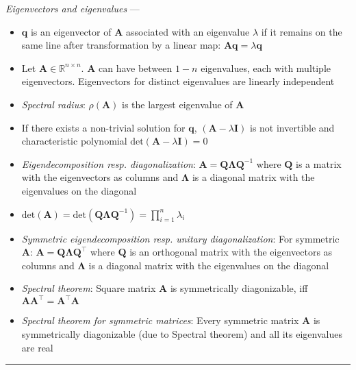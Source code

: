 \emph{Eigenvectors and eigenvalues} --- 
\begin{itemize}
    \item $\boldsymbol{q}$ is an eigenvector of $\boldsymbol{A}$ associated with an eigenvalue $\lambda$ if it remains on the same line after transformation by a linear map: $\boldsymbol{A}\boldsymbol{q} = \lambda\boldsymbol{q}$
    \item Let $\boldsymbol{A} \in \mathbb{R}^{n \times n}$. $\boldsymbol{A}$ can have between $1-n$ eigenvalues, each with multiple eigenvectors. Eigenvectors for distinct eigenvalues are linearly independent
    \item \emph{Spectral radius}: $\rho(\boldsymbol{A})$ is the largest eigenvalue of $\boldsymbol{A}$
    \item If there exists a non-trivial solution for $\boldsymbol{q}$, $(\boldsymbol{A}-\lambda\boldsymbol{I})$ is not invertible and characteristic polynomial $\textrm{det}(\boldsymbol{A}-\lambda\boldsymbol{I}) = 0$
    \item \emph{Eigendecomposition resp. diagonalization}: $\boldsymbol{A} = \boldsymbol{Q}\boldsymbol{\Lambda}\boldsymbol{Q}^{-1}$ where $\boldsymbol{Q}$ is a matrix with the eigenvectors as columns and $\boldsymbol{\Lambda}$ is a diagonal matrix with the eigenvalues on the diagonal
    \item $\textrm{det}(\boldsymbol{A}) = \textrm{det}(\boldsymbol{Q}\boldsymbol{\Lambda}\boldsymbol{Q}^{-1}) = \prod_{i=1}^n \lambda_i$
    \item \emph{Symmetric eigendecomposition resp. unitary diagonalization}: For symmetric $\boldsymbol{A}$: $\boldsymbol{A} = \boldsymbol{Q}\boldsymbol{\Lambda}\boldsymbol{Q}^\intercal$ where $\boldsymbol{Q}$ is an orthogonal matrix with the eigenvectors as columns and $\boldsymbol{\Lambda}$ is a diagonal matrix with the eigenvalues on the diagonal
    \item \emph{Spectral theorem}: Square matrix $\boldsymbol{A}$ is symmetrically diagonizable, iff $\boldsymbol{A}\boldsymbol{A}^\intercal = \boldsymbol{A}^\intercal\boldsymbol{A}$
    \item \emph{Spectral theorem for symmetric matrices}: Every symmetric matrix $\boldsymbol{A}$ is symmetrically diagonizable (due to Spectral theorem) and all its eigenvalues are real
\end{itemize}

{\color{lightgray}\hrule height 0.001mm}

